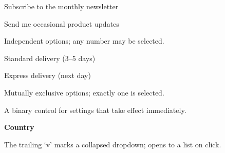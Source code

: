 \vspace{4mm}

\quad
Subscribe to the monthly newsletter
\vspace{2mm}\par
{}\quad
Send me occasional product updates

{\small\color{muted} Independent options; any number may be selected.}

\vspace{4mm}

\quad
Standard delivery (3--5 days)
\vspace{2mm}\par
{}\quad
Express delivery (next day)

{\small\color{muted} Mutually exclusive options; exactly one is selected.}

\vspace{4mm}

\quad
{}\quad
{}
\vspace{2mm}\par
{}\quad
{}\quad
{}

{\small\color{muted} A binary control for settings that take effect immediately.}

\vspace{4mm}

{\small\textbf{Country}}\par
\vspace{1mm}

{\small\color{muted} The trailing `v' marks a collapsed dropdown; opens to a list on click.}

\clearpage
